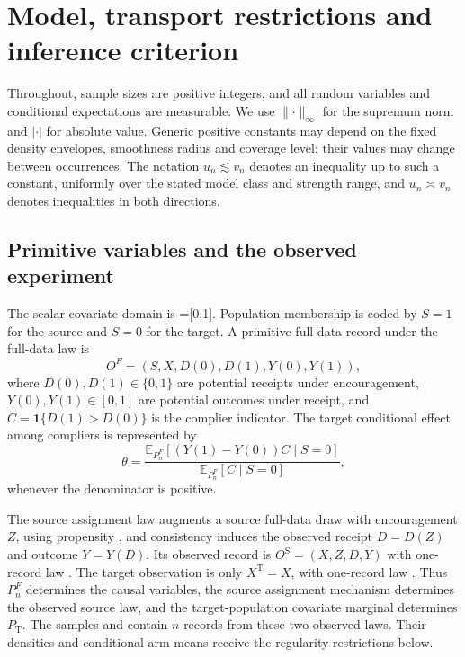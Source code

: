 \section{Model, transport restrictions and inference criterion}
\label{sec:model}

Throughout, sample sizes are positive integers, and all random variables and conditional expectations are measurable. We use \(\lVert\cdot\rVert_\infty\) for the supremum norm and \(|\cdot|\) for absolute value. Generic positive constants may depend on the fixed density envelopes, smoothness radius and coverage level; their values may change between occurrences. The notation \(u_n\lesssim v_n\) denotes an inequality up to such a constant, uniformly over the stated model class and strength range, and \(u_n\asymp v_n\) denotes inequalities in both directions.

\subsection{Primitive variables and the observed experiment}

The scalar covariate domain is =[0,1]. Population membership is coded by \(S=1\) for the source and \(S=0\) for the target. A primitive full-data record under the full-data law  is
\[
O^F=(S,X,D(0),D(1),Y(0),Y(1)),
\]
where \(D(0),D(1)\in\{0,1\}\) are potential receipts under encouragement, \(Y(0),Y(1)\in[0,1]\) are potential outcomes under receipt, and \(C=\mathbf 1\{D(1)>D(0)\}\) is the complier indicator. The target conditional effect among compliers is represented by
\[
\theta=
\frac{\mathbb E_{P_n^F}[(Y(1)-Y(0))C\mid S=0]}
     {\mathbb E_{P_n^F}[C\mid S=0]},
\]
whenever the denominator is positive.

The source assignment law augments a source full-data draw with encouragement \(Z\), using propensity , and consistency induces the observed receipt \(D=D(Z)\) and outcome \(Y=Y(D)\). Its observed record is \(O^{\mathrm S}=(X,Z,D,Y)\) with one-record law . The target observation is only \(X^{\mathrm T}=X\), with one-record law . Thus \(P_n^F\) determines the causal variables, the source assignment mechanism determines the observed source law, and the target-population covariate marginal determines \(P_{\mathrm T}\). The samples  and  contain \(n\) records from these two observed laws. Their densities and conditional arm means receive the regularity restrictions below.

